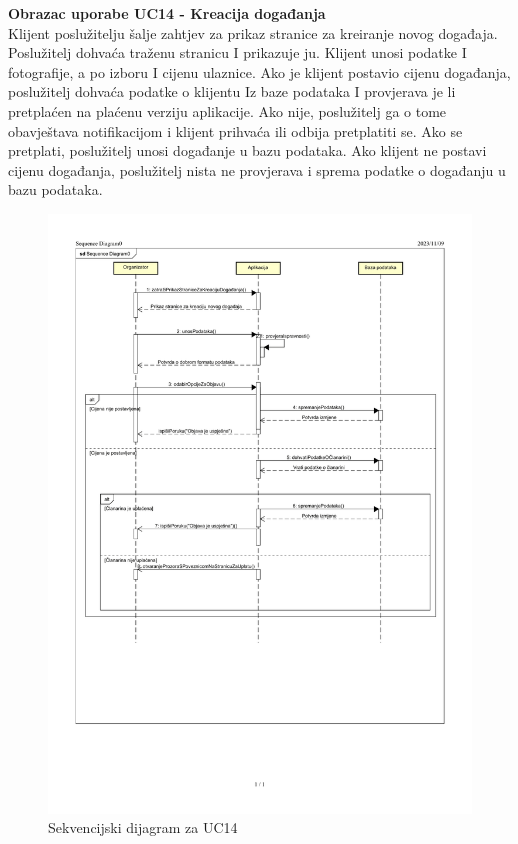 				
				\eject
				
				
				
				\textbf{\large Obrazac uporabe UC14 - Kreacija događanja}\\
				
				Klijent poslužitelju šalje zahtjev za prikaz stranice za kreiranje novog događaja. Poslužitelj dohvaća traženu stranicu I prikazuje ju. Klijent unosi podatke I fotografije, a po izboru I cijenu ulaznice. Ako je klijent postavio cijenu događanja, poslužitelj dohvaća podatke o klijentu Iz baze podataka I provjerava je li pretplaćen na plaćenu verziju aplikacije. Ako nije, poslužitelj ga o tome obavještava notifikacijom i klijent prihvaća ili odbija pretplatiti se. Ako se pretplati, poslužitelj unosi događanje u bazu podataka. Ako klijent ne postavi cijenu događanja, poslužitelj nista ne provjerava i sprema podatke o događanju u bazu podataka.
				
				\begin{figure}[H]
						\includegraphics[scale=0.7]{slike/sek_dijagram3-1.PNG} %
						\centering
						\caption{Sekvencijski dijagram za UC14}
						\label{fig:promjene}
				\end{figure}
				
